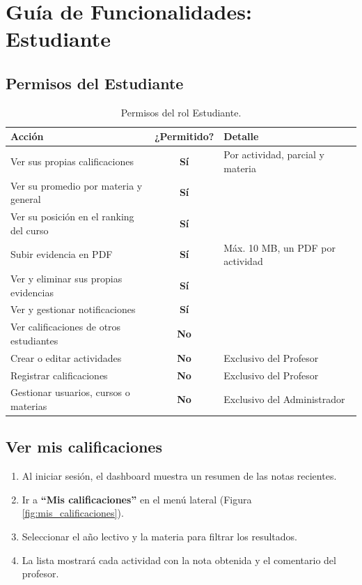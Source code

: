 \documentclass[12pt, a4paper]{article}
\newcommand{\puede}{\textcolor{yescolor}{\textbf{Sí}}}
\newcommand{\nopuede}{\textcolor{nocolor}{\textbf{No}}}
\begin{document}
\section{Guía de Funcionalidades: Estudiante}
\label{sec:estudiante}

\subsection{Permisos del Estudiante}

\begin{table}[H]
    \centering
    \begin{tabular}{p{5.5cm} c p{6.5cm}}
        \toprule
        \textbf{Acción} & \textbf{¿Permitido?} & \textbf{Detalle} \\
        \midrule
        Ver sus propias calificaciones         & \puede    & Por actividad, parcial y materia \\
        Ver su promedio por materia y general  & \puede    & \\
        Ver su posición en el ranking del curso & \puede   & \\
        Subir evidencia en PDF                 & \puede    & Máx. 10 MB, un PDF por actividad \\
        Ver y eliminar sus propias evidencias  & \puede    & \\
        Ver y gestionar notificaciones         & \puede    & \\
        Ver calificaciones de otros estudiantes & \nopuede & \\
        Crear o editar actividades             & \nopuede  & Exclusivo del Profesor \\
        Registrar calificaciones               & \nopuede  & Exclusivo del Profesor \\
        Gestionar usuarios, cursos o materias  & \nopuede  & Exclusivo del Administrador \\
        \bottomrule
    \end{tabular}
    \caption{Permisos del rol Estudiante.}
\end{table}

\subsection{Ver mis calificaciones}

\begin{enumerate}
    \item Al iniciar sesión, el dashboard muestra un resumen de las notas recientes.
    \item Ir a \textbf{``Mis calificaciones''} en el menú lateral (Figura \ref{fig:mis_calificaciones}).
    \item Seleccionar el año lectivo y la materia para filtrar los resultados.
    \item La lista mostrará cada actividad con la nota obtenida y el comentario del profesor.
\end{enumerate}
\end{document}
